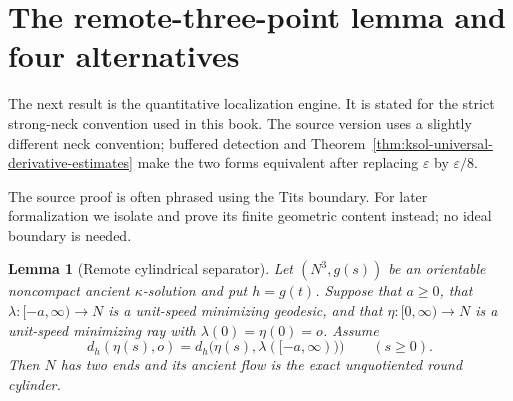 \documentclass[10pt]{coll-l}
\newtheorem{lemma}[theorem]{Lemma}
\theoremstyle{definition}
\theoremstyle{remark}
\numberwithin{section}{chapter}
\numberwithin{equation}{chapter}
\begin{document}
\section{The remote-three-point lemma and four alternatives}
\label{sec:ncs-four-alternatives}

The next result is the quantitative localization engine.  It is stated for
the strict strong-neck convention used in this book.  The source version
uses a slightly different neck convention; buffered detection and
Theorem~\ref{thm:ksol-universal-derivative-estimates} make the two forms
equivalent after replacing $\varepsilon$ by $\varepsilon/8$.

The source proof is often phrased using the Tits boundary.  For later
formalization we isolate and prove its finite geometric content instead;
no ideal boundary is needed.

\begin{lemma}[Remote cylindrical separator]
\label{lem:ncs-remote-cylindrical-separator}
Let $(N^3,g(s))$ be an orientable noncompact ancient
$\kappa$-solution and put $h=g(t)$.  Suppose that $a\geq0$, that
$\lambda:[-a,\infty)\to N$ is a unit-speed minimizing geodesic, and that
$\eta:[0,\infty)\to N$ is a unit-speed minimizing ray with
$\lambda(0)=\eta(0)=o$.  Assume
\begin{equation}
 d_h(\eta(s),o)=d_h\bigl(\eta(s),\lambda([-a,\infty))\bigr)
                         \qquad(s\geq0).                \label{eq:ncs-nearest-ray-projection}
\end{equation}
Then $N$ has two ends and its ancient flow is the exact unquotiented round
cylinder.
\end{lemma}
\end{document}
